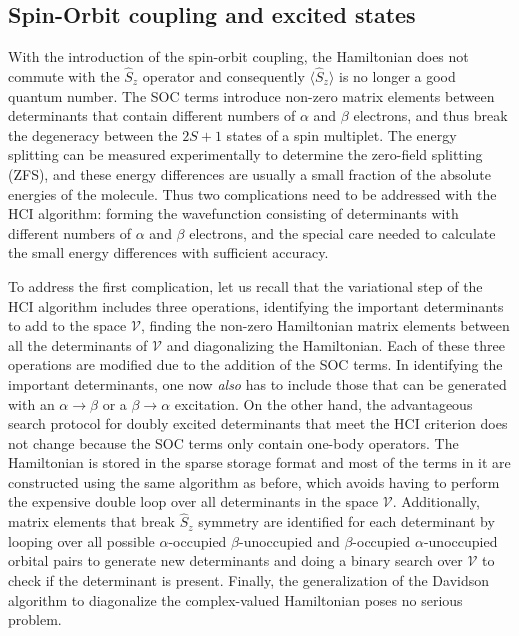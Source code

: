\documentclass[10pt,aps,prb,twocolumn,amsmath,amssymb,superscriptaddress]{revtex4-1}
\begin{document}
\subsection{Spin-Orbit coupling and excited states}
With the introduction of the spin-orbit coupling, the Hamiltonian does not commute with the $\hat{S}_z$ operator and consequently $\langle \hat{S}_z\rangle$ is no longer a good quantum number. The SOC terms introduce non-zero matrix elements between determinants that contain different numbers of $\alpha$ and $\beta$ electrons, and thus break the degeneracy between the $2S+1$ states of a spin multiplet. The energy splitting can be measured experimentally to determine the zero-field splitting (ZFS), and
these energy differences are usually a small fraction of the absolute energies of the molecule. Thus two complications need to be addressed with the HCI algorithm: forming the wavefunction consisting of determinants with different numbers of $\alpha$ and $\beta$ electrons, and the special care needed to calculate the small energy differences with sufficient accuracy.


To address the first complication, let us recall that the variational step of the HCI algorithm includes three operations, identifying the important determinants to add to the space $\mathcal{V}$, finding the non-zero Hamiltonian matrix elements between all the determinants of $\mathcal{V}$ and diagonalizing the Hamiltonian. Each of these three operations are modified due to the addition of the SOC terms.
In identifying the important determinants, one now \emph{also} has to include those that can be generated with an $\alpha\rightarrow\beta$ or a $\beta\rightarrow\alpha$ excitation. On the other hand, the advantageous search protocol for doubly excited determinants that meet the HCI criterion does not change because the SOC terms only contain one-body operators. The Hamiltonian is stored in the sparse storage format and most of the terms in it are constructed using the
same algorithm as before\cite{ShaHolUmr-JCTC-17}, which avoids having to perform the expensive double loop over all determinants in the space $\mathcal{V}$. Additionally, matrix elements that break $\hat{S}_z$ symmetry are identified for each determinant by looping over all possible $\alpha$-occupied $\beta$-unoccupied and $\beta$-occupied $\alpha$-unoccupied orbital pairs to generate new determinants and doing a binary search over $\mathcal{V}$ to check if the determinant is present. Finally, the generalization of the Davidson algorithm to diagonalize the complex-valued Hamiltonian poses no serious problem.
\end{document}
